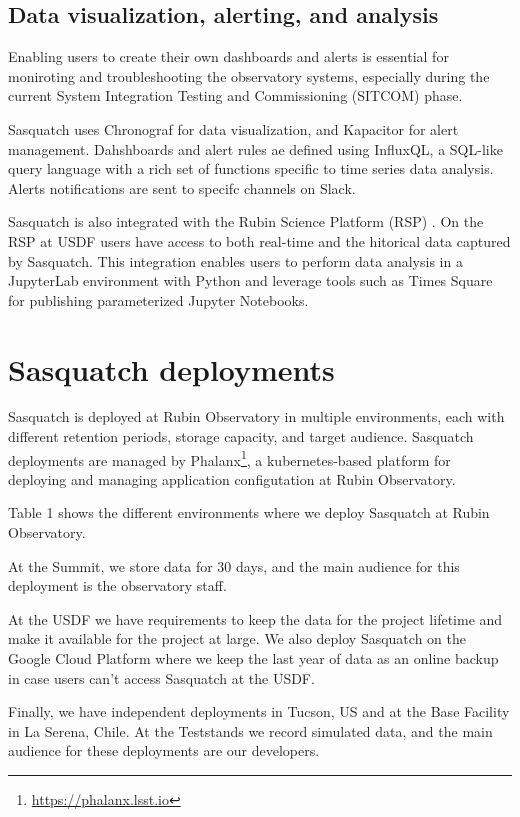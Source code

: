 \subsection{Data visualization, alerting, and analysis}

Enabling users to create their own dashboards and alerts is essential for moniroting and troubleshooting the observatory systems, especially during the current System Integration Testing and Commissioning (SITCOM) phase.

Sasquatch uses Chronograf for data visualization, and Kapacitor for alert management. Dahshboards and alert rules ae defined using InfluxQL, a SQL-like query language with a rich set of functions specific to time series data analysis. Alerts notifications are sent to specifc channels on Slack.

Sasquatch is also integrated with the Rubin Science Platform (RSP) \cite{DMTN-082, DMTN-212}. On the RSP at USDF users have access to both real-time and the hitorical data captured by Sasquatch. This integration enables users to perform data analysis in a JupyterLab environment with Python and leverage tools such as Times Square \cite{SQR-062} for publishing parameterized Jupyter Notebooks.

\section{Sasquatch deployments}

Sasquatch is deployed at Rubin Observatory in multiple environments, each with different retention periods, storage capacity, and target audience. Sasquatch deployments are managed by Phalanx\footnote{\url{https://phalanx.lsst.io}}, a kubernetes-based platform for deploying and managing application configutation at Rubin Observatory.

Table 1 shows the different environments where we deploy Sasquatch at Rubin Observatory.

At the Summit, we store data for 30 days, and the main audience for this deployment is the observatory staff.

At the USDF we have requirements to keep the data for the project lifetime and make it available for the project at large. We also deploy Sasquatch on the Google Cloud Platform where we keep the last year of data as an online backup in case users can't access Sasquatch at the USDF.

Finally, we have independent deployments in Tucson, US and at the Base Facility in La Serena, Chile. At the Teststands we record simulated data, and the main audience for these deployments are our developers.

